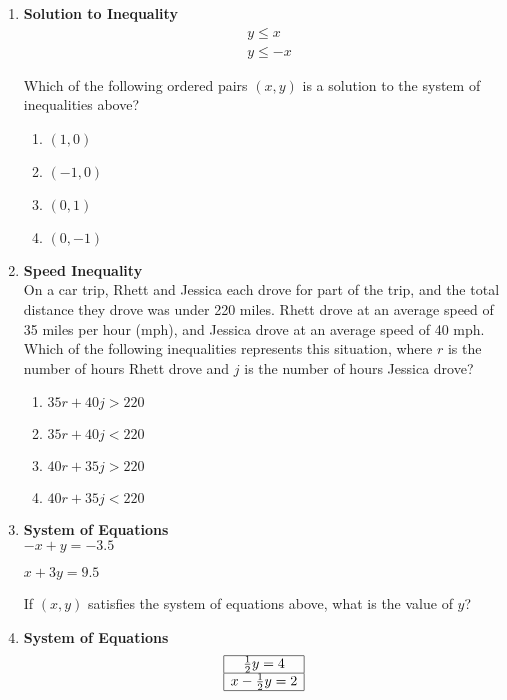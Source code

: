 \begin{enumerate}
\item \textbf{Solution to Inequality}\\
$$
\begin{aligned}
& y \leq x \\
& y \leq -x
\end{aligned}
$$

Which of the following ordered pairs $(x, y)$ is a solution to the system of inequalities above?
\begin{enumerate}[label=(\Alph*)]
  \item $(1,0)$
  \item $(-1,0)$
  \item $(0,1)$
  \item $(0,-1)$
\end{enumerate}
\begin{subanswer}
\end{subanswer}

\item \textbf{Speed Inequality}\\
On a car trip, Rhett and Jessica each drove for part of the trip, and the total distance they drove was under 220 miles. Rhett drove at an average speed of 35 miles per hour (mph), and Jessica drove at an average speed of 40 mph. Which of the following inequalities represents this situation, where $r$ is the number of hours Rhett drove and $j$ is the number of hours Jessica drove?
\begin{enumerate}[label=(\Alph*)]
  \item $35r + 40j > 220$
  \item $35r + 40j < 220$
  \item $40r + 35j > 220$
  \item $40r + 35j < 220$
\end{enumerate}
\begin{subanswer}
\end{subanswer}

\item \textbf{System of Equations}\\
$-x + y = -3.5$

$x + 3y = 9.5$

If $(x, y)$ satisfies the system of equations above, what is the value of $y$?
\begin{subanswer}
\end{subanswer}

\item \textbf{System of Equations}\\
$$
\begin{array}{|c|}
\hline \frac{1}{2}y = 4 \\
\hline x - \frac{1}{2}y = 2 \\
\hline
\end{array}
$$


\end{enumerate}
